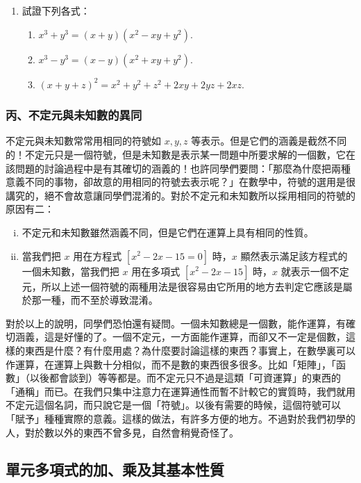 \begin{enumerate}[1.]
  \item 試證下列各式：
  \begin{enumerate}[(1)]
    \item $x^3+y^3=(x+y)(x^2-xy+y^2)$.
    \item $x^3-y^3=(x-y)(x^2+xy+y^2)$.
    \item $(x+y+z)^2=x^2+y^2+z^2+2xy+2yz+2xz$.
  \end{enumerate}
\end{enumerate}

\subsubsection*{丙、不定元與未知數的異同}\label{subsec:5-1-c}

不定元與未知數常常用相同的符號如 $x, y, z$ 等表示。但是它們的涵義是截然不同的！不定元只是一個符號，但是未知數是表示某一問題中所要求解的一個數，它在該問題的討論過程中是有其確切的涵義的！也許同學們要問：「那麼為什麼把兩種意義不同的事物，卻故意的用相同的符號去表示呢？」在數學中，符號的選用是很講究的，絕不會故意讓同學們混淆的。對於不定元和未知數所以採用相同的符號的原因有二：
\begin{enumerate}[(i)]
  \item 不定元和未知數雖然涵義不同，但是它們在運算上具有相同的性質。
  \item 當我們把 $x$ 用在方程式 $[x^2-2x-15=0]$ 時，$x$ 顯然表示滿足該方程式的一個未知數，當我們把 $x$ 用在多項式 $[x^2-2x-15]$ 時，$x$ 就表示一個不定元，所以上述一個符號的兩種用法是很容易由它所用的地方去判定它應該是屬於那一種，而不至於導致混淆。
\end{enumerate}

對於以上的說明，同學們恐怕還有疑問。一個未知數總是一個數，能作運算，有確切涵義，這是好懂的了。一個不定元，一方面能作運算，而卻又不一定是個數，這樣的東西是什麼？有什麼用處？為什麼要討論這樣的東西？事實上，在數學裏可以作運算，在運算上與數十分相似，而不是數的東西很多很多。比如「矩陣」，「函數」（以後都會談到）等等都是。而不定元只不過是這類「可資運算」的東西的「通稱」而已。在我們只集中注意力在運算通性而暫不計較它的實質時，我們就用不定元這個名詞，而只說它是一個「符號」。以後有需要的時候，這個符號可以「賦予」種種實際的意義。這樣的做法，有許多方便的地方。不過對於我們初學的人，對於數以外的東西不曾多見，自然會稍覺奇怪了。

\subsection{單元多項式的加、乘及其基本性質}\label{sec:5-2}

